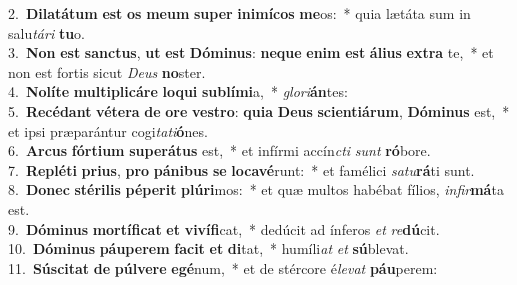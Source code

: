 {2.~}\textbf{Di}\textbf{la}\textbf{tá}\textbf{tum} \textbf{est} \textbf{os} \textbf{me}\textbf{um} \textbf{su}\textbf{per} \textbf{i}\textbf{ni}\textbf{mí}\textbf{cos} \textbf{me}os:~* quia lætáta sum in salu\textit{tá}\textit{ri} \textbf{tu}o.\\
{3.~}\textbf{Non} \textbf{est} \textbf{san}\textbf{ctus}, \textbf{ut} \textbf{est} \textbf{Dó}\textbf{mi}\textbf{nus}: \textbf{ne}\textbf{que} \textbf{e}\textbf{nim} \textbf{est} \textbf{á}\textbf{li}\textbf{us} \textbf{ex}\textbf{tra} te,~* et non est fortis sicut \textit{De}\textit{us} \textbf{no}ster.\\
{4.~}\textbf{No}\textbf{lí}\textbf{te} \textbf{mul}\textbf{ti}\textbf{pli}\textbf{cá}\textbf{re} \textbf{lo}\textbf{qui} \textbf{su}\textbf{blí}\textbf{mi}a,~* \textit{glo}\textit{ri}\textbf{án}tes:\\
{5.~}\textbf{Re}\textbf{cé}\textbf{dant} \textbf{vé}\textbf{te}\textbf{ra} \textbf{de} \textbf{o}\textbf{re} \textbf{ve}\textbf{stro}: \textbf{qui}\textbf{a} \textbf{De}\textbf{us} \textbf{sci}\textbf{en}\textbf{ti}\textbf{á}\textbf{rum}, \textbf{Dó}\textbf{mi}\textbf{nus} est,~* et ipsi præparántur cogi\textit{ta}\textit{ti}\textbf{ó}nes.\\
{6.~}\textbf{Ar}\textbf{cus} \textbf{fór}\textbf{ti}\textbf{um} \textbf{su}\textbf{pe}\textbf{rá}\textbf{tus} est,~* et infírmi accín\textit{cti} \textit{sunt} \textbf{ró}bore.\\
{7.~}\textbf{Re}\textbf{plé}\textbf{ti} \textbf{pri}\textbf{us}, \textbf{pro} \textbf{pá}\textbf{ni}\textbf{bus} \textbf{se} \textbf{lo}\textbf{ca}\textbf{vé}runt:~* et famélici \textit{sa}\textit{tu}\textbf{rá}ti sunt.\\
{8.~}\textbf{Do}\textbf{nec} \textbf{sté}\textbf{ri}\textbf{lis} \textbf{pé}\textbf{pe}\textbf{rit} \textbf{plú}\textbf{ri}mos:~* et quæ multos habébat fílios, \textit{in}\textit{fir}\textbf{má}ta est.\\
{9.~}\textbf{Dó}\textbf{mi}\textbf{nus} \textbf{mor}\textbf{tí}\textbf{fi}\textbf{cat} \textbf{et} \textbf{vi}\textbf{ví}\textbf{fi}cat,~* dedúcit ad ínferos \textit{et} \textit{re}\textbf{dú}cit.\\
{10.~}\textbf{Dó}\textbf{mi}\textbf{nus} \textbf{páu}\textbf{pe}\textbf{rem} \textbf{fa}\textbf{cit} \textbf{et} \textbf{di}tat,~* humíli\textit{at} \textit{et} \textbf{sú}blevat.\\
{11.~}\textbf{Sú}\textbf{sci}\textbf{tat} \textbf{de} \textbf{púl}\textbf{ve}\textbf{re} \textbf{e}\textbf{gé}num,~* et de stércore é\textit{le}\textit{vat} \textbf{páu}perem:\\
